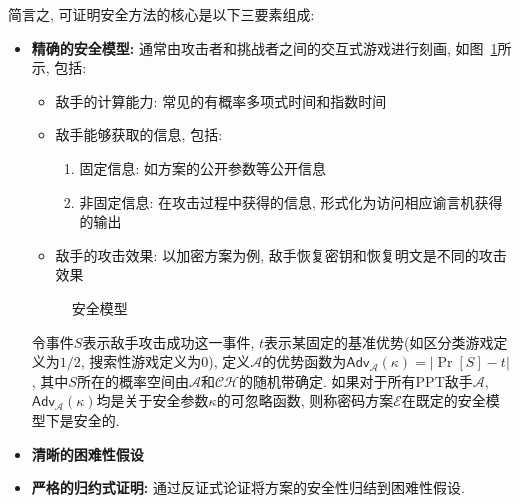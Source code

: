 简言之, 可证明安全方法的核心是以下三要素组成: 
\begin{itemize}
\item \textbf{精确的安全模型:} 通常由攻击者和挑战者之间的交互式游戏进行刻画, 如图~\ref{figure:security-model}所示, 包括: 
\begin{itemize}
	\item 敌手的计算能力: 常见的有概率多项式时间和指数时间
	\item 敌手能够获取的信息, 包括:
	\begin{enumerate}
		\item 固定信息: 如方案的公开参数等公开信息
		\item 非固定信息: 在攻击过程中获得的信息, 形式化为访问相应谕言机获得的输出
	\end{enumerate}
    \item 敌手的攻击效果: 以加密方案为例, 敌手恢复密钥和恢复明文是不同的攻击效果
\end{itemize}

\begin{figure}[!hbtp]
\begin{center}
\end{center}
\caption{安全模型}\label{figure:security-model}
\end{figure}
令事件$S$表示敌手攻击成功这一事件, $t$表示某固定的基准优势(如区分类游戏定义为$1/2$, 搜索性游戏定义为$0$), 
定义$\mathcal{A}$的优势函数为$\mathsf{Adv}_\mathcal{A}(\kappa) = |\Pr[S] - t|$, 
其中$S$所在的概率空间由$\mathcal{A}$和$\mathcal{CH}$的随机带确定. 
如果对于所有PPT敌手$\mathcal{A}$, $\mathsf{Adv}_\mathcal{A}(\kappa)$均是关于安全参数$\kappa$的可忽略函数, 
则称密码方案$\mathcal{E}$在既定的安全模型下是安全的. 

\item \textbf{清晰的困难性假设}
\item \textbf{严格的归约式证明:} 通过反证式论证将方案的安全性归结到困难性假设. 
\end{itemize}  

